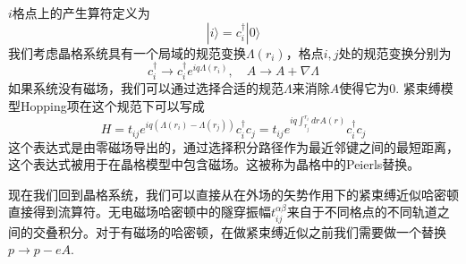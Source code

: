 \documentclass{article}
\numberwithin{equation}{subsection}
\begin{document}
$i$格点上的产生算符定义为
\begin{equation}
    |i\rangle=c_i^\dagger|0\rangle
\end{equation}
我们考虑晶格系统具有一个局域的规范变换$\Lambda(r_i)$，格点$i,j$处的规范变换分别为
\begin{equation}
    c_i^\dagger\longrightarrow c_i^\dagger e^{iq\Lambda(r_i)},\quad A\longrightarrow A+\nabla\Lambda
\end{equation}
如果系统没有磁场，我们可以通过选择合适的规范$\Lambda$来消除$A$使得它为$0$. 紧束缚模型Hopping项在这个规范下可以写成
\begin{equation}
    H=t_{ij}e^{iq(\Lambda(r_i)-\Lambda(r_j))}c_i^\dagger c_j=t_{ij}e^{iq\int_{r_j}^{r_i}drA(r)}c_i^\dagger c_j
\end{equation}
这个表达式是由零磁场导出的，通过选择积分路径作为最近邻键之间的最短距离，这个表达式被用于在晶格模型中包含磁场。这被称为晶格中的Peierls替换。

现在我们回到晶格系统，我们可以直接从在外场的矢势作用下的紧束缚近似哈密顿直接得到流算符。无电磁场哈密顿中的隧穿振幅$t_{ij}^{\alpha\beta}$来自于不同格点的不同轨道之间的交叠积分。对于有磁场的哈密顿，在做紧束缚近似之前我们需要做一个替换$p\rightarrow p-eA$. 
\end{document}
